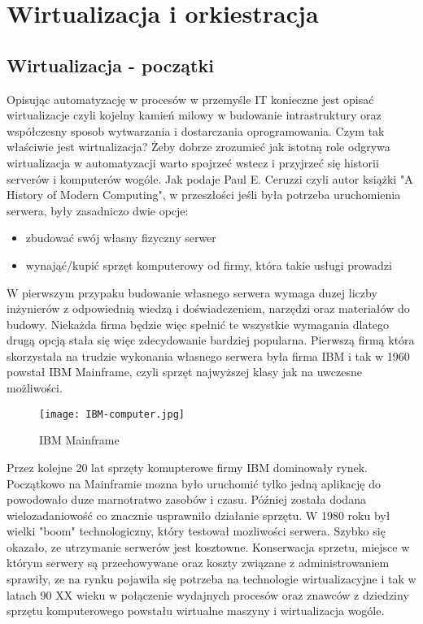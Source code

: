\section{Wirtualizacja i orkiestracja}

\subsection{Wirtualizacja - początki}
Opisując automatyzację w procesów w przemyśle IT konieczne jest opisać wirtualizacje czyli kojelny kamień milowy w budowanie intrastruktury oraz współczesny sposob wytwarzania i dostarczania oprogramowania. Czym tak właściwie jest wirtualizacja? 
Żeby dobrze zrozumieć jak istotną role odgrywa wirtualizacja w automatyzacji warto spojrzeć wstecz i przyjrzeć się historii serverów i komputerów wogóle.   Jak podaje Paul E. Ceruzzi czyli autor książki "A History of Modern Computing", w przeszłości jeśli była potrzeba uruchomienia serwera, były zasadniczo dwie opcje: 
\begin{itemize}
    \item zbudować swój własny fizyczny serwer
    \item wynająć/kupić sprzęt komputerowy od firmy, która takie usługi prowadzi
\end{itemize}
W pierwszym przypaku budowanie własnego serwera wymaga duzej liczby inżynierów z odpowiednią wiedzą i doświadczeniem, narzędzi oraz materiałów do budowy. Niekażda firma będzie więc spełnić te wszystkie wymagania dlatego drugą opcją stała się więc zdecydowanie bardziej popularna. Pierwszą firmą która skorzystała na trudzie wykonania własnego serwera była firma IBM i tak w 1960 powstał IBM Mainframe, czyli sprzęt najwyższej klasy jak na uwczesne możliwości.

\begin{figure}[htbp]
    \centering
    \texttt{[image: IBM-computer.jpg]}
    \caption{IBM Mainframe}
    \label{fig:ibm-mainframe}
\end{figure}

Przez kolejne 20 lat sprzęty komupterowe firmy IBM dominowały rynek. Początkowo na Mainframie mozna było uruchomić tylko jedną aplikację do powodowało duze marnotratwo zasobów i czasu. Później została dodana wielozadaniowość co znacznie usprawniło działanie sprzętu. W 1980 roku był wielki "boom" technologiczny, który testował mozliwości serwera. Szybko się okazało, ze utrzymanie serwerów jest kosztowne. Konserwacja sprzetu, miejsce w którym serwery są przechowywane oraz koszty związane z administrowaniem sprawiły, ze na rynku pojawiła się potrzeba na technologie wirtualizacyjne i tak w latach 90 XX wieku w połączenie wydajnych procesów oraz znawców z dziedziny sprzętu komputerowego powstału wirtualne maszyny i wirtualizacja wogóle. 

